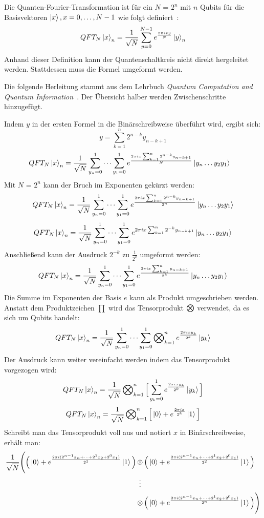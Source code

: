 Die Quanten-Fourier-Transformation ist für ein \(N\) = \(2^n\) mit \(n\) Qubits
für die Basisvektoren \(\ket{x}, x = 0,\dotsc,N-1\) wie folgt definiert~\cite[216]{homeister2023quantum215}:
\[QFT_{N}\ket{x}_{n} = \frac{1}{\sqrt{N}}\sum_{y=0}^{N-1}  e^{\frac{2 \pi i x y}{N}}\ket{y}_{n}\]
Anhand dieser Definition kann der Quantenschaltkreis nicht direkt hergeleitet werden.
Stattdessen muss die Formel umgeformt werden.

Die folgende Herleitung stammt aus dem Lehrbuch \textit{Quantum Computation and Quantum Information}~\cite[218]{nielsen_chuang_2010}.
Der Übersicht halber werden Zwischenschritte hinzugefügt.

Indem \(y\) in der ersten Formel in die Binärschreibweise überführt wird, ergibt sich:
\[ y = \sum_{k=1}^{n}2^{n-k} y_{n-k+1}\]  
\begin{align*}
  QFT_{N}\ket{x}_{n} &=
    \frac{1}{\sqrt{N}}
    \sum_{y_n=0}^{1} \dotsb
    \sum_{y_1=0}^{1} e^{\frac{2 \pi i x \sum_{k=1}^{n}2^{n-k} y_{n-k+1}}{N}}
    \ket{y_n \dotsc y_{2}y_{1}}
\end{align*}
Mit \(N\) = \(2^n\) kann der Bruch im Exponenten gekürzt werden:
\[QFT_{N}\ket{x}_{n} = \frac{1}{\sqrt{N}}\sum_{y_n=0}^{1}\dotsb\sum_{y_1=0}^{1}  e^{\frac{2 \pi i x \sum_{k=1}^{n}2^{n-k} y_{n-k+1}}{2^n}}\ket{y_n \dotsc y_{2}y_{1}}\]
\[QFT_{N}\ket{x}_{n} = \frac{1}{\sqrt{N}}\sum_{y_n=0}^{1}\dotsb\sum_{y_1=0}^{1}  e^{2 \pi i x \sum_{k=1}^{n}2^{-k} y_{n-k+1}}\ket{y_n \dotsc y_{2}y_{1}}\]
Anschließend kann der Ausdruck \(2^{-k}\) zu \(\frac{1}{2^k}\) umgeformt werden: 
\[QFT_{N}\ket{x}_{n} = \frac{1}{\sqrt{N}}\sum_{y_n=0}^{1}\dotsb\sum_{y_1=0}^{1}  e^{\frac{2 \pi i x \sum_{k=1}^{n} y_{n-k+1}}{2^k}}\ket{y_n \dotsc y_{2}y_{1}}\]
Die Summe im Exponenten der Basis \(e\) kann als Produkt umgeschrieben werden.
Anstatt dem Produktzeichen \(\prod\) wird das Tensorprodukt \(\operatorname{\bigotimes}\) verwendet, da es sich um Qubits handelt:
\[QFT_{N}\ket{x}_{n} = \frac{1}{\sqrt{N}}\sum_{y_n=0}^{1}\dotsb\sum_{y_1=0}^{1} \operatorname{\bigotimes}_{k=1}^n{ e^{\frac{2 \pi i x y_k}{2^k}}}\ket{y_{k}}\]
Der Ausdruck kann weiter vereinfacht werden indem das Tensorprodukt vorgezogen wird:
\[QFT_{N}\ket{x}_{n} = \frac{1}{\sqrt{N}}\operatorname{\bigotimes}_{k=1}^n \Big[  \sum_{y_k=0}^{1}{ e^{\frac{2 \pi i x y_k}{2^k}}}\ket{y_{k}}\Big]\]
\[QFT_{N}\ket{x}_{n} = \frac{1}{\sqrt{N}}\operatorname{\bigotimes}_{k=1}^n \Big[  \ket{0} + { e^{\frac{2 \pi i x}{2^k}}}\ket{1}\Big]\] 
Schreibt man das Tensorprodukt voll aus und notiert \(x\) in Binärschreibweise, erhält man:
\begin{align*}
\frac{1}{\sqrt{N}}\Bigg(
  \Big(\ket{0} + { e^{\frac{2 \pi i (2^{n-1}x_n+\dotsb+2^1x_2+2^0x_1)}{2^1}}}\ket{1}\Big)
  &\tensor
  \Big(\ket{0} + { e^{\frac{2 \pi i (2^{n-1}x_n+\dotsb+2^1x_2+2^0x_1)}{2^2}}}\ket{1}\Big) \\
  &\vdotswithin{\tensor} \\
  &\tensor
  \Big(\ket{0} + { e^{\frac{2 \pi i (2^{n-1}x_n+\dotsb+2^1x_2+2^0x_1)}{2^n}}}\ket{1}\Big)
  \Bigg)
\end{align*}
